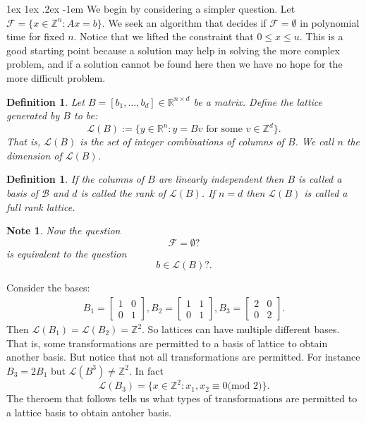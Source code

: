 \documentclass[11pt]{article}
\makeatletter
\renewcommand\paragraph{\@startsection{paragraph}{4}{0mm}%
                                    {1ex \@plus1ex \@minus.2ex}%
                                    {-1em}%
                                    {\normalfont\normalsize\bfseries}}
\newtheorem{definition}[fact]{Definition}
\newtheorem{note}[fact]{Note}
\newcommand{\R}{\ensuremath{\mathbb R}}
\newcommand{\Z}{\ensuremath{\mathbb Z}}
\makeatother
\begin{document}
\paragraph{}
We begin by considering a simpler question. Let $\mathcal{F} = \{x \in \Z^n: Ax=b \}$. We seek an algorithm that decides if $\mathcal{F} = \emptyset$ in polynomial time for fixed $n$. Notice that we lifted the constraint that $0 \leq x \leq u$. This is a good starting point because a solution may help in solving the more complex problem, and if a solution cannot be found here then we have no hope for the more difficult problem.
\begin{definition}
Let $B = [b_1,\dots,b_d] \in \R^{n \times d}$ be a matrix. Define the lattice generated by $B$ to be:
$$\mathcal{L}(B) := \{y \in \R^n : y = Bv \text{ for some } v \in \Z^d \}.$$
That is, $\mathcal{L}(B)$ is the set of integer combinations of columns of $B$. We call $n$ the dimension of $\mathcal{L}(B)$.
\end{definition}
\begin{definition}
If the columns of $B$ are linearly independent then $B$ is called a basis of $\mathcal{B}$ and $d$ is called the rank of $\mathcal{L}(B)$. If $n=d$ then $\mathcal{L}(B)$ is called a full rank lattice.
\end{definition}
\begin{note}
Now the question $$\mathcal{F} = \emptyset?$$ is equivalent to the question $$b \in \mathcal{L}(B)?.$$ 
\end{note}
\begin{example}
Consider the bases:
\begin{align*}
B_1 = \begin{bmatrix} 1 & 0 \\ 0 & 1 \end{bmatrix},
B_2 = \begin{bmatrix} 1 & 1 \\ 0 & 1 \end{bmatrix},
B_3 = \begin{bmatrix} 2 & 0 \\ 0 & 2 \end{bmatrix}.
\end{align*}
Then $\mathcal{L}(B_1) = \mathcal{L}(B_2) = \Z^2$. So lattices can have multiple different bases. That is, some transformations are permitted to a basis of lattice to obtain another basis. But notice that not all transformations are permitted. For instance $B_3 = 2B_1$ but $\mathcal{L}(B^3) \neq \Z^2$. In fact $$\mathcal{L}(B_3) = \{x \in \Z^2: x_1,x_2 \equiv 0 \text{(mod $2$)} \}.$$
The theroem that follows tells us what types of transformations are permitted to a lattice basis to obtain antoher basis.
\end{example}
\end{document}
